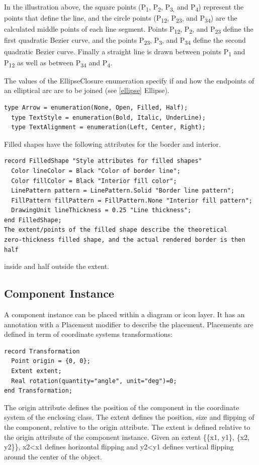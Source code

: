 \documentclass[10pt,a4paper]{report}
\def\doublelabel#1{\label{#1}\hypertarget{#1}{}}
\begin{document}
In the illustration above, the square points (P\textsubscript{1},
P\textsubscript{2}, P\textsubscript{3,} and P\textsubscript{4})
represent the points that define the line, and the circle points
(P\textsubscript{12}, P\textsubscript{23}, and P\textsubscript{34}) are
the calculated middle points of each line segment. Points
P\textsubscript{12}, P\textsubscript{2}, and P\textsubscript{23} define
the first quadratic Bezier curve, and the points P\textsubscript{23},
P\textsubscript{3}, and P\textsubscript{34} define the second quadratic
Bezier curve. Finally a straight line is drawn between points
P\textsubscript{1} and P\textsubscript{12} as well as between
P\textsubscript{34} and P\textsubscript{4}.

The values of the EllipseClosure enumeration specify if and how the
endpoints of an elliptical arc are to be joined (see \ref{ellipse} Ellipse).

\begin{lstlisting}[language=modelica]
  type Arrow = enumeration(None, Open, Filled, Half);
  type TextStyle = enumeration(Bold, Italic, UnderLine);
  type TextAlignment = enumeration(Left, Center, Right);
\end{lstlisting}
Filled shapes have the following attributes for the border and interior.

\begin{lstlisting}[language=modelica]
record FilledShape "Style attributes for filled shapes"
  Color lineColor = Black "Color of border line";
  Color fillColor = Black "Interior fill color";
  LinePattern pattern = LinePattern.Solid "Border line pattern";
  FillPattern fillPattern = FillPattern.None "Interior fill pattern";
  DrawingUnit lineThickness = 0.25 "Line thickness";
end FilledShape;
The extent/points of the filled shape describe the theoretical
zero-thickness filled shape, and the actual rendered border is then half
\end{lstlisting}
inside and half outside the extent.

\subsection{Component Instance}\doublelabel{component-instance}

A component instance can be placed within a diagram or icon layer. It
has an annotation with a Placement modifier to describe the placement.
Placements are defined in term of coordinate systems transformations:

\begin{lstlisting}[language=modelica]
record Transformation
  Point origin = {0, 0};
  Extent extent;
  Real rotation(quantity="angle", unit="deg")=0;
end Transformation;
\end{lstlisting}
The origin attribute defines the position of the component in the
coordinate system of the enclosing class. The extent defines the
position, size and flipping of the component, relative to the origin
attribute. The extent is defined relative to the origin attribute of the
component instance. Given an extent \{\{x1, y1\}, \{x2, y2\}\},
x2\textless{}x1 defines horizontal flipping and y2\textless{}y1 defines
vertical flipping around the center of the object.
\end{document}
